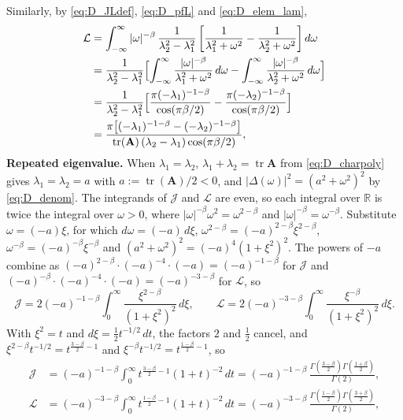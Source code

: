 \documentclass[12pt]{article}
\newcommand{\tr}{\operatorname{tr}}
\newcommand{\R}{\mathbb{R}}
\begin{document}
Similarly, by \eqref{eq:D_JLdef}, \eqref{eq:D_pfL} and \eqref{eq:D_elem_lam},
\begin{equation}
\begin{aligned}
    \mathcal{L}&=\int_{-\infty}^{\infty}|\omega|^{-\beta}\,\frac{1}{\lambda_2^2-\lambda_1^2}
      \left[\frac{1}{\lambda_1^2+\omega^2}-\frac{1}{\lambda_2^2+\omega^2}\right]d\omega\\
    &=\frac{1}{\lambda_2^2-\lambda_1^2}\Bigl[\int_{-\infty}^{\infty}\frac{|\omega|^{-\beta}}{\lambda_1^2+\omega^2}\,d\omega
      -\int_{-\infty}^{\infty}\frac{|\omega|^{-\beta}}{\lambda_2^2+\omega^2}\,d\omega\Bigr]\\
    &=\frac{1}{\lambda_2^2-\lambda_1^2}\Bigl[\frac{\pi(-\lambda_1)^{-1-\beta}}{\cos(\pi\beta/2)}
      -\frac{\pi(-\lambda_2)^{-1-\beta}}{\cos(\pi\beta/2)}\Bigr]\\
    &=\frac{\pi\bigl[(-\lambda_1)^{-1-\beta}-(-\lambda_2)^{-1-\beta}\bigr]}{\tr(\mathbf{A})\,(\lambda_2-\lambda_1)\cos(\pi\beta/2)},
\end{aligned}
    \label{eq:D_Lchain}
\end{equation}
\textbf{Repeated eigenvalue.} When $\lambda_1=\lambda_2$, $\lambda_1+\lambda_2=\tr\mathbf{A}$ from \eqref{eq:D_charpoly} gives
$\lambda_1=\lambda_2=a$ with $a:=\tr(\mathbf{A})/2<0$, and $|\Delta(\omega)|^2=(a^2+\omega^2)^2$ by \eqref{eq:D_denom}. The integrands of $\mathcal{J}$ and $\mathcal{L}$ are even, so each integral over $\R$ is twice the
integral over $\omega>0$, where $|\omega|^{-\beta}\omega^2=\omega^{2-\beta}$ and $|\omega|^{-\beta}=\omega^{-\beta}$. Substitute $\omega=(-a)\xi$, for
which $d\omega=(-a)\,d\xi$, $\omega^{2-\beta}=(-a)^{2-\beta}\xi^{2-\beta}$, $\omega^{-\beta}=(-a)^{-\beta}\xi^{-\beta}$ and
$(a^2+\omega^2)^2=(-a)^4(1+\xi^2)^2$. The powers of $-a$ combine as $(-a)^{2-\beta}\cdot(-a)^{-4}\cdot(-a)=(-a)^{-1-\beta}$ for
$\mathcal{J}$ and $(-a)^{-\beta}\cdot(-a)^{-4}\cdot(-a)=(-a)^{-3-\beta}$ for $\mathcal{L}$, so
\begin{equation}
    \mathcal{J}=2(-a)^{-1-\beta}\int_0^\infty\frac{\xi^{2-\beta}}{(1+\xi^2)^2}\,d\xi,
    \qquad
    \mathcal{L}=2(-a)^{-3-\beta}\int_0^\infty\frac{\xi^{-\beta}}{(1+\xi^2)^2}\,d\xi.
    \label{eq:D_rep_sub}
\end{equation}
With $\xi^2=t$ and $d\xi=\frac12t^{-1/2}\,dt$, the factors $2$ and $\frac12$ cancel, and
$\xi^{2-\beta}t^{-1/2}=t^{\frac{3-\beta}{2}-1}$ and $\xi^{-\beta}t^{-1/2}=t^{\frac{1-\beta}{2}-1}$, so
\begin{align}
    \mathcal{J}&=(-a)^{-1-\beta}\int_0^\infty t^{\frac{3-\beta}{2}-1}(1+t)^{-2}\,dt
    =(-a)^{-1-\beta}\,\frac{\Gamma\!\left(\frac{3-\beta}{2}\right)\Gamma\!\left(\frac{1+\beta}{2}\right)}{\Gamma(2)},
    \label{eq:D_rep_betaJ}\\
    \mathcal{L}&=(-a)^{-3-\beta}\int_0^\infty t^{\frac{1-\beta}{2}-1}(1+t)^{-2}\,dt
    =(-a)^{-3-\beta}\,\frac{\Gamma\!\left(\frac{1-\beta}{2}\right)\Gamma\!\left(\frac{3+\beta}{2}\right)}{\Gamma(2)},
    \label{eq:D_rep_betaL}
\end{align}
\end{document}
